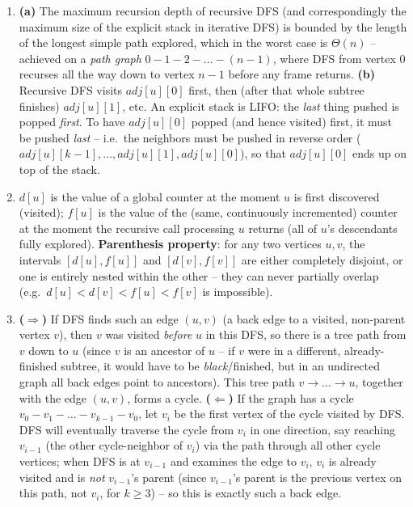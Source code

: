 \documentclass[11pt]{article}
\begin{document}
\begin{enumerate}[label=\textbf{A\arabic*.}, leftmargin=2.2em]
\item \textbf{(a)} The maximum recursion depth of recursive DFS (and correspondingly the
maximum size of the explicit stack in iterative DFS) is bounded by the length of the
longest simple path explored, which in the worst case is $\Theta(n)$ -- achieved on a
\emph{path graph} $0-1-2-\dots-(n-1)$, where DFS from vertex 0 recurses all the way down
to vertex $n-1$ before any frame returns. \textbf{(b)} Recursive DFS visits $adj[u][0]$
first, then (after that whole subtree finishes) $adj[u][1]$, etc. An explicit stack is
LIFO: the \emph{last} thing pushed is popped \emph{first}. To have $adj[u][0]$ popped
(and hence visited) first, it must be pushed \emph{last} -- i.e.\ the neighbors must be
pushed in reverse order ($adj[u][k-1], \dots, adj[u][1], adj[u][0]$), so that
$adj[u][0]$ ends up on top of the stack.

\item $d[u]$ is the value of a global counter at the moment $u$ is first discovered
(visited); $f[u]$ is the value of the (same, continuously incremented) counter at the
moment the recursive call processing $u$ returns (all of $u$'s descendants fully
explored). \textbf{Parenthesis property}: for any two vertices $u,v$, the intervals
$[d[u],f[u]]$ and $[d[v],f[v]]$ are either completely disjoint, or one is entirely nested
within the other -- they can never partially overlap (e.g.\ $d[u] < d[v] < f[u] < f[v]$ is
impossible).

\item \textbf{($\Rightarrow$)} If DFS finds such an edge $(u,v)$ (a back edge to a
visited, non-parent vertex $v$), then $v$ was visited \emph{before} $u$ in this DFS, so
there is a tree path from $v$ down to $u$ (since $v$ is an ancestor of $u$ -- if $v$ were
in a different, already-finished subtree, it would have to be \emph{black}/finished, but
in an undirected graph all back edges point to ancestors). This tree path $v \to \dots \to
u$, together with the edge $(u,v)$, forms a cycle. \textbf{($\Leftarrow$)} If the graph has
a cycle $v_0 - v_1 - \dots - v_{k-1} - v_0$, let $v_i$ be the first vertex of the cycle
visited by DFS. DFS will eventually traverse the cycle from $v_i$ in one direction, say
reaching $v_{i-1}$ (the other cycle-neighbor of $v_i$) via the path through all other
cycle vertices; when DFS is at $v_{i-1}$ and examines the edge to $v_i$, $v_i$ is already
visited and is \emph{not} $v_{i-1}$'s parent (since $v_{i-1}$'s parent is the previous
vertex on this path, not $v_i$, for $k \ge 3$) -- so this is exactly such a back edge.


\end{enumerate}
\end{document}
